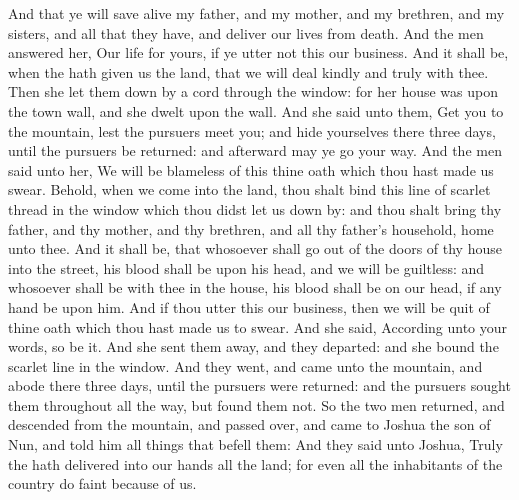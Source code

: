 \begin{biblechapter}
\verse And that ye will save alive my father, and my mother, and my brethren, and my sisters, and all that they have, and deliver our lives from death.
\verse And the men answered her, Our life for yours, if ye utter not this our business. And it shall be, when the \LORD hath given us the land, that we will deal kindly and truly with thee.
\verse Then she let them down by a cord through the window: for her house was upon the town wall, and she dwelt upon the wall.
\verse And she said unto them, Get you to the mountain, lest the pursuers meet you; and hide yourselves there three days, until the pursuers be returned: and afterward may ye go your way.
\verse And the men said unto her, We will be blameless of this thine oath which thou hast made us swear.
\verse Behold, when we come into the land, thou shalt bind this line of scarlet thread in the window which thou didst let us down by: and thou shalt bring thy father, and thy mother, and thy brethren, and all thy father's household, home unto thee.
\verse And it shall be, that whosoever shall go out of the doors of thy house into the street, his blood shall be upon his head, and we will be guiltless: and whosoever shall be with thee in the house, his blood shall be on our head, if any hand be upon him.
\verse And if thou utter this our business, then we will be quit of thine oath which thou hast made us to swear.
\verse And she said, According unto your words, so be it. And she sent them away, and they departed: and she bound the scarlet line in the window.
\verse And they went, and came unto the mountain, and abode there three days, until the pursuers were returned: and the pursuers sought them throughout all the way, but found them not.
\verse So the two men returned, and descended from the mountain, and passed over, and came to Joshua the son of Nun, and told him all things that befell them:
\verse And they said unto Joshua, Truly the \LORD hath delivered into our hands all the land; for even all the inhabitants of the country do faint because of us.
\end{biblechapter}

